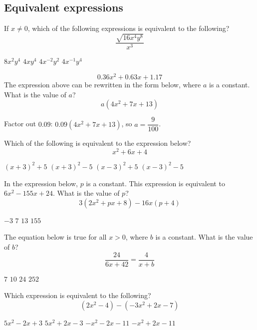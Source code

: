 
\subsection*{Equivalent expressions}

\question[1]
If $x \neq 0$, which of the following expressions is equivalent to the following?
\[
  \frac{\sqrt{16 x^{4} y^{8}}}{x^{3}}
\]
\begin{choices}
  \choice $8 x^{2} y^{4}$
  \choice $4 x y^{4}$
  \choice $4 x^{-2} y^{2}$
  \CorrectChoice $4 x^{-1} y^{4}$ 
\end{choices}

\question[1]
\[
  0.36 x^{2}+0.63 x+1.17
\]
The expression above can be rewritten in the form below, where $a$ is a constant. What is the value of $a$?
\[
  a\left(4 x^{2}+7 x+13\right)
\]
\begin{solutionorbox}[1.25in]
  Factor out $0.09$: $0.09(4x^2+7x+13)$, so $a=\dfrac{9}{100}$.
\end{solutionorbox}

\question[1]
Which of the following is equivalent to the expression below?
\[
  x^{2}+6 x+4
\]
\begin{choices}
  \choice $(x+3)^{2}+5$
  \CorrectChoice $(x+3)^{2}-5$
  \choice $(x-3)^{2}+5$ 
  \choice $(x-3)^{2}-5$
\end{choices}

\newpage

\question[1]
In the expression below, $p$ is a constant. This expression is equivalent to $6 x^{2}-155 x+24$. What is the value of $p$?
\[
  3\left(2 x^{2}+p x+8\right)-16 x(p+4)
\]
\begin{choices}
  \choice $-3$
  \CorrectChoice $7$
  \choice $13$
  \choice $155$
\end{choices}


\question[1]
The equation below is true for all $x>0$, where $b$ is a constant. What is the value of $b$?
\[
  \frac{24}{6 x+42}=\frac{4}{x+b}
\]
\begin{choices}
  \CorrectChoice $7$
  \choice $10$
  \choice $24$
  \choice $252$
\end{choices}

\question[1]
Which expression is equivalent to the following?
\[
  \left(2 x^{2}-4\right)-\left(-3 x^{2}+2 x-7\right)
\]
\begin{choices}
  \CorrectChoice $5 x^{2}-2 x+3$
  \choice $5 x^{2}+2 x-3$
  \choice $-x^{2}-2 x-11$
  \choice $-x^{2}+2 x-11$
\end{choices}

